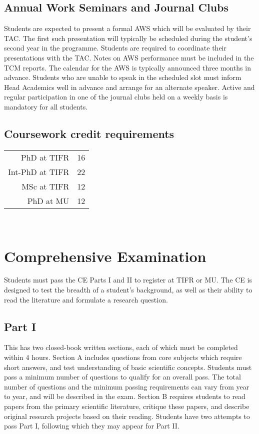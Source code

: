 \documentclass[a4paper,10pt]{article}
\begin{document}
\subsection{Annual Work Seminars and Journal Clubs}
Students are expected to present a formal AWS
which will be evaluated by their TAC. The first such presentation will typically
be scheduled during the student's second year in the programme. Students are
required to coordinate their presentations with the TAC. Notes on AWS
performance must be included in the TCM reports. The calendar for the AWS is
typically announced three months in advance. Students who are unable to speak in
the scheduled slot must inform Head Academics well in advance and arrange for an
alternate speaker. Active and regular participation in one of the journal clubs
held on a weekly basis is mandatory for all students. 

\subsection{Coursework credit requirements}

\begin{tabular}{r l}
PhD at TIFR & 16 \\
Int-PhD at TIFR & 22 \\
MSc at TIFR & 12 \\
PhD at MU & 12
\end{tabular} \newline
  

 \section{Comprehensive Examination}

Students must pass the CE Parts I and II to register at TIFR or MU. The CE is designed to
test the breadth of a student’s background, as well as their ability to read the literature and
formulate a research question.

\subsection{Part I} This has two closed-book written sections, each of which
must be completed within 4 hours. Section A includes questions from core
subjects which require short answers, and test understanding of basic scientific
concepts. Students must pass a minimum number of questions to qualify for an
overall pass. The total number of questions and the minimum passing requirements
can vary from year to year, and will be described in the exam. Section B
requires students to read papers from the primary scientific literature,
critique these papers, and describe original research projects based on their
reading. Students have two attempts to pass Part I, following which they may
appear for Part II.
\end{document}
